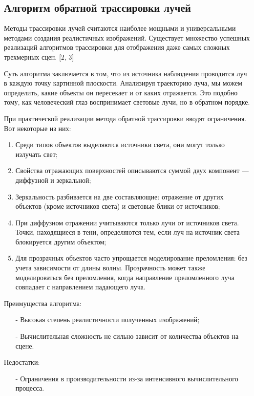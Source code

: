 \subsection{Алгоритм обратной трассировки лучей}

Методы трассировки лучей считаются наиболее мощными и универсальными методами создания реалистичных изображений. Существует множество успешных реализаций алгоритмов трассировки для отображения даже самых сложных трехмерных сцен. [2, 3]

Суть алгоритма заключается в том, что из источника наблюдения проводится луч в каждую точку картинной плоскости. Анализируя траекторию луча, мы можем определить, какие объекты он пересекает и от каких отражается. Это подобно тому, как человеческий глаз воспринимает световые лучи, но в обратном порядке.

При практической реализации метода обратной трассировки вводят ограничения. Вот некоторые из них:
\begin{enumerate}[label=\arabic*)]
	\item Среди типов объектов выделяются источники света, они могут только излучать свет;
	\item Свойства отражающих поверхностей описываются суммой двух компонент — диффузной и зеркальной;
	\item Зеркальность разбивается на две составляющие: отражение от других объектов (кроме источников света) и световые блики от источников;
	\item При диффузном отражении учитываются только лучи от источников света. Точки, находящиеся в тени, определяются тем, если луч на источник света блокируется другим объектом;
	\item Для прозрачных объектов часто упрощается моделирование преломления: без учета зависимости от длины волны. Прозрачность может также моделироваться без преломления, когда направление преломленного луча совпадает с направлением падающего луча.
\end{enumerate}

Преимущества алгоритма:
\begin{itemize}[label=\arabic*)]
	\item[-] Высокая степень реалистичности полученных изображений;
	\item[-] Вычислительная сложность не сильно зависит от количества объектов на сцене.
\end{itemize}
Недостатки:
\begin{itemize}[label=\arabic*)]
	\item[-] Ограничения в производительности из-за интенсивного вычислительного процесса.
\end{itemize}

